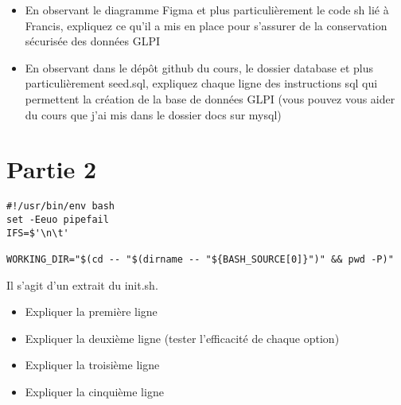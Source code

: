 \documentclass[12pt, letterpaper]{article}
\begin{document}
\begin{itemize}
    \item En observant le diagramme Figma et plus particulièrement le code sh lié à Francis, expliquez ce qu'il a mis en place pour s'assurer de la conservation sécurisée des données GLPI 
    \item En observant dans le dépôt github du cours, le dossier database et plus particulièrement seed.sql, expliquez chaque ligne des instructions sql qui permettent la création de la base de données GLPI (vous pouvez vous aider du cours que j'ai mis dans le dossier docs sur mysql)
\end{itemize}


\section{Partie 2}

\begin{verbatim}
#!/usr/bin/env bash
set -Eeuo pipefail
IFS=$'\n\t'

WORKING_DIR="$(cd -- "$(dirname -- "${BASH_SOURCE[0]}")" && pwd -P)"  
\end{verbatim}

\begin{tcolorbox}
    Il s'agit d'un extrait du init.sh. 
\end{tcolorbox}

\begin{itemize}
    \item Expliquer la première ligne
    \item Expliquer la deuxième ligne (tester l'efficacité de chaque option)
    \item Expliquer la troisième ligne 
    \item Expliquer la cinquième ligne
\end{itemize}
\end{document}
